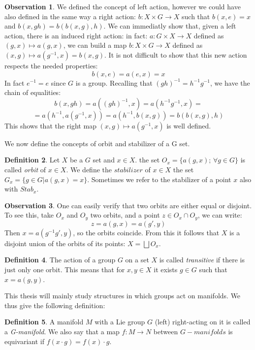 \documentclass[12pt,a4paper]{report}
\theoremstyle{definition}
\newtheorem{Def}{Definition}[chapter]
\theoremstyle{Theorem}
\theoremstyle{definition}
\theoremstyle{definition}
\newtheorem{Obs}[Def]{Observation}
\begin{document}
		\begin{Obs}
			We defined the concept of left action, however we could have also defined in the same way a right action: $b:X\times G\rightarrow X$ such that $b(x,e)=x$ and $b(x,gh)=b(b(x,g),h)$. We can immediatly show that, given a left action, there is an induced right action: in fact: $a:G\times X\rightarrow X$ defined as $(g,x)\longmapsto a(g,x)$, we can build a map $b:X\times G\rightarrow X$ defined as $(x,g)\longmapsto a(g^{-1},x)=b(x,g)$. 
			It is not difficult to show that this new action respects the needed properties:
			$$b(x,e)=a(e,x)=x$$
			In fact $e^{-1}=e$ since $G$ is a group. Recalling that $(gh)^{-1}=h^{-1}g^{-1}$, we have the chain of equalities:
			$$b(x,gh)=a((gh)^{-1},x)=a(h^{-1}g^{-1},x)=$$$$=a(h^{-1},a(g^{-1},x))=a(h^{-1},b(x,g))=b(b(x,g),h)$$
			This shows that the right map $(x,g)\longmapsto a(g^{-1},x)$ is well defined.
		\end{Obs}
		We now define the concepts of orbit and stabilizer of a G set.
		\begin{Def}
			Let $X$ be a $G$ set and $x\in X$. the set $O_x=\{a(g,x); \, \forall g\in G\}$ is called \textit{orbit} of $x\in X$. We define the $\textit{stabilizer}$ of $x\in X$ the set $G_x=\{g\in G|a(g,x)=x\}$. Sometimes we refer to the stabilizer of a point $x$ also with $Stab_x$.
		\end{Def}
		\begin{Obs} \label{Obs: 2.1}
			One can easily verify that two orbits are either equal or disjoint. To see this, take $O_x$ and $O_y$ two orbits, and a point $z\in O_x\cap O_y$, we can write:
			$$z=a(g,x)=a(g',y)$$
			Then $x=a(g^{-1}g',y)$, so the orbits coincide.
			From this it follows that $X$ is a disjoint union of the orbits of its points: $X=\bigsqcup O_x$.
		\end{Obs}
		\begin{Def}
			The action of a group $G$ on a set $X$ is called \textit{transitive} if there is just only one orbit. This means that for $x,y\in X$ it exists $g\in G$ such that $x=a(g,y)$.
		\end{Def}
		This thesis will mainly study structures in which groups act on manifolds. We thus give the following definition:
		\begin{Def}
			A manifold $M$ with a Lie group $G$ (left) right-acting on it is called a \textit{G-manifold}. We also say that a map $f:M\rightarrow N$ between $G-manifolds$ is equivariant if $f(x\cdot g)=f(x)\cdot g$.
		\end{Def}		
\end{document}
